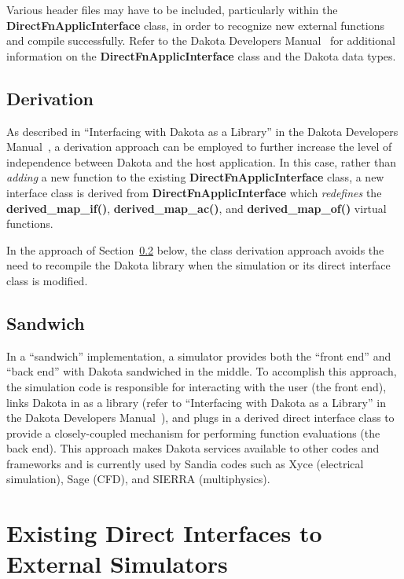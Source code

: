 Various header files may have to be included, particularly within the
\textbf{DirectFnApplicInterface} class, in order to recognize new
external functions and compile successfully. Refer to the Dakota
Developers Manual~\cite{DevMan} for additional information on the
\textbf{DirectFnApplicInterface} class and the Dakota data types.

\subsection{Derivation}\label{advint:direct:derivation}

As described in ``Interfacing with Dakota as a Library'' in the Dakota
Developers Manual~\cite{DevMan}, a derivation approach can be employed
to further increase the level of independence between Dakota and the
host application. In this case, rather than \emph{adding} a new
function to the existing \textbf{DirectFnApplicInterface} class, a new
interface class is derived from \textbf{DirectFnApplicInterface} which
\emph{redefines} the \textbf{derived\_map\_if()},
\textbf{derived\_map\_ac()}, and \textbf{derived\_map\_of()} virtual 
functions.

In the approach of Section~\ref{advint:direct:sandwich} below, the 
class derivation approach avoids the need to recompile the Dakota 
library when the simulation or its direct interface class is modified.

\subsection{Sandwich}\label{advint:direct:sandwich}

In a ``sandwich'' implementation, a simulator provides both the
``front end'' and ``back end'' with Dakota sandwiched in the middle.
To accomplish this approach, the simulation code is responsible for
interacting with the user (the front end), links Dakota in as a
library (refer to ``Interfacing with Dakota as a Library'' in the
Dakota Developers Manual~\cite{DevMan}), and plugs in a derived direct
interface class to provide a closely-coupled mechanism for performing
function evaluations (the back end). This approach makes Dakota
services available to other codes and frameworks and is currently used
by Sandia codes such as Xyce (electrical simulation), Sage (CFD), and
SIERRA (multiphysics).


\section{Existing Direct Interfaces to External Simulators}\label{advint:existingdirect}

